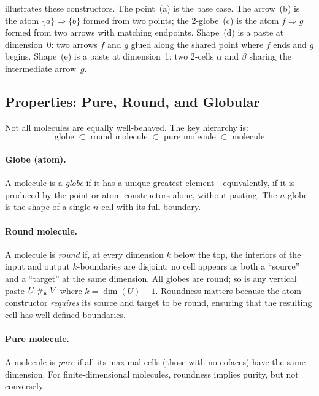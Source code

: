 \documentclass[acmsmall,screen,nonacm]{acmart}
\begin{document}
 illustrates these constructors.  The
point~(a) is the base case.  The arrow~(b) is the atom
$\{a\} \Rightarrow \{b\}$ formed from two points; the 2-globe~(c) is
the atom $f \Rightarrow g$ formed from two arrows with matching
endpoints.  Shape~(d) is a paste at dimension~0: two arrows $f$ and $g$
glued along the shared point where $f$ ends and $g$ begins.  Shape~(e)
is a paste at dimension~1: two 2-cells $\alpha$ and $\beta$ sharing the
intermediate arrow~$g$.

\subsection{Properties: Pure, Round, and Globular}
\label{sec:molecules:props}

Not all molecules are equally well-behaved.  The key hierarchy is:
\[
  \text{globe} \;\subset\; \text{round molecule}
  \;\subset\; \text{pure molecule}
  \;\subset\; \text{molecule}
\]

\paragraph{Globe (atom).}
A molecule is a \emph{globe} if it has a unique greatest
element---equivalently, if it is produced by the point or atom
constructors alone, without pasting.  The $n$-globe is the shape of a
single $n$-cell with its full boundary.

\paragraph{Round molecule.}
A molecule is \emph{round} if, at every dimension $k$ below the top,
the interiors of the input and output $k$-boundaries are disjoint:
no cell appears as both a ``source'' and a ``target'' at the same
dimension.  All globes are round; so is any vertical paste
$U \mathbin{\#_{k}} V$ where $k = \dim(U) - 1$.  Roundness matters because
the atom constructor \emph{requires} its source and target to be round,
ensuring that the resulting cell has well-defined boundaries.

\paragraph{Pure molecule.}
A molecule is \emph{pure} if all its maximal cells (those with no
cofaces) have the same dimension.  For finite-dimensional molecules,
roundness implies purity, but not conversely.
\end{document}
